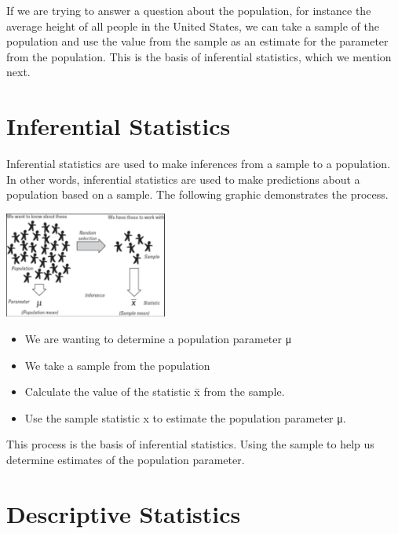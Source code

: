 \documentclass[
  letterpaper,
  DIV=11,
  numbers=noendperiod]{scrreprt}
\providecommand{\tightlist}{%
  \setlength{\itemsep}{0pt}\setlength{\parskip}{0pt}}\usepackage{longtable,booktabs,array}
\begin{document}
If we are trying to answer a question about the population, for instance
the average height of all people in the United States, we can take a
sample of the population and use the value from the sample as an
estimate for the parameter from the population. This is the basis of
inferential statistics, which we mention next.

\section*{Inferential Statistics}\label{inferential-statistics}


Inferential statistics are used to make inferences from a sample to a
population. In other words, inferential statistics are used to make
predictions about a population based on a sample. The following graphic
demonstrates the process.

\includegraphics[width=0.4\textwidth,height=\textheight]{./images/SL_1.jpg}

\begin{itemize}
\tightlist
\item
  We are wanting to determine a population parameter μ
\item
  We take a sample from the population
\item
  Calculate the value of the statistic x̄ from the sample.
\item
  Use the sample statistic x to estimate the population parameter μ.
\end{itemize}

This process is the basis of inferential statistics. Using the sample to
help us determine estimates of the population parameter.

\section*{Descriptive Statistics}\label{descriptive-statistics}

\end{document}
